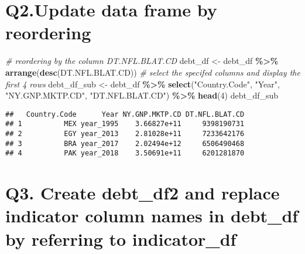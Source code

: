 \documentclass[
]{article}
\newenvironment{Shaded}{\begin{snugshade}}{\end{snugshade}}
\newcommand{\CommentTok}[1]{\textcolor[rgb]{0.56,0.35,0.01}{\textit{#1}}}
\newcommand{\DecValTok}[1]{\textcolor[rgb]{0.00,0.00,0.81}{#1}}
\newcommand{\FunctionTok}[1]{\textcolor[rgb]{0.13,0.29,0.53}{\textbf{#1}}}
\newcommand{\NormalTok}[1]{#1}
\newcommand{\OtherTok}[1]{\textcolor[rgb]{0.56,0.35,0.01}{#1}}
\newcommand{\SpecialCharTok}[1]{\textcolor[rgb]{0.81,0.36,0.00}{\textbf{#1}}}
\newcommand{\StringTok}[1]{\textcolor[rgb]{0.31,0.60,0.02}{#1}}
\begin{document}
\section{Q2.Update data frame by
reordering}\label{q2.update-data-frame-by-reordering}

\begin{Shaded}
\begin{Highlighting}[]
\CommentTok{\# reordering by the column \textquotesingle{}DT.NFL.BLAT.CD\textquotesingle{}    }
\NormalTok{debt\_df }\OtherTok{\textless{}{-}}\NormalTok{ debt\_df }\SpecialCharTok{\%\textgreater{}\%}
  \FunctionTok{arrange}\NormalTok{(}\FunctionTok{desc}\NormalTok{(DT.NFL.BLAT.CD))}
\CommentTok{\# select the specifed columns and display the first 4 rows}
\NormalTok{debt\_df\_sub }\OtherTok{\textless{}{-}}\NormalTok{ debt\_df }\SpecialCharTok{\%\textgreater{}\%}
  \FunctionTok{select}\NormalTok{(}\StringTok{"Country.Code"}\NormalTok{, }\StringTok{"Year"}\NormalTok{, }\StringTok{"NY.GNP.MKTP.CD"}\NormalTok{, }\StringTok{"DT.NFL.BLAT.CD"}\NormalTok{) }\SpecialCharTok{\%\textgreater{}\%}
  \FunctionTok{head}\NormalTok{(}\DecValTok{4}\NormalTok{)}
\NormalTok{debt\_df\_sub}
\end{Highlighting}
\end{Shaded}

\begin{verbatim}
##   Country.Code      Year NY.GNP.MKTP.CD DT.NFL.BLAT.CD
## 1          MEX year_1995    3.66827e+11     9398190731
## 2          EGY year_2013    2.81028e+11     7233642176
## 3          BRA year_2017    2.02494e+12     6506490468
## 4          PAK year_2018    3.50691e+11     6201281870
\end{verbatim}

\section{Q3. Create debt\_df2 and replace indicator column names in
debt\_df by referring to
indicator\_df}\label{q3.-create-debt_df2-and-replace-indicator-column-names-in-debt_df-by-referring-to-indicator_df}
\end{document}
